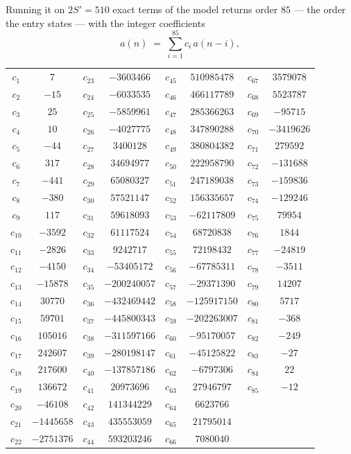 \documentclass[11pt,a4paper]{article}
\theoremstyle{plain}
\theoremstyle{definition}
\begin{document}
Running it on $2S'=510$ exact terms of the model returns order $85$ --- the order the
entry states --- with the integer coefficients
\[
a(n)\;=\;\sum_{i=1}^{85}c_i\,a(n-i),
\]
\begin{center}\small
\begin{tabular}{cccccccc}
$c_{1}$ & $7$ & $c_{23}$ & $-3603466$ & $c_{45}$ & $510985478$ & $c_{67}$ & $3579078$ \\
$c_{2}$ & $-15$ & $c_{24}$ & $-6033535$ & $c_{46}$ & $466117789$ & $c_{68}$ & $5523787$ \\
$c_{3}$ & $25$ & $c_{25}$ & $-5859961$ & $c_{47}$ & $285366263$ & $c_{69}$ & $-95715$ \\
$c_{4}$ & $10$ & $c_{26}$ & $-4027775$ & $c_{48}$ & $347890288$ & $c_{70}$ & $-3419626$ \\
$c_{5}$ & $-44$ & $c_{27}$ & $3400128$ & $c_{49}$ & $380804382$ & $c_{71}$ & $279592$ \\
$c_{6}$ & $317$ & $c_{28}$ & $34694977$ & $c_{50}$ & $222958790$ & $c_{72}$ & $-131688$ \\
$c_{7}$ & $-441$ & $c_{29}$ & $65080327$ & $c_{51}$ & $247189038$ & $c_{73}$ & $-159836$ \\
$c_{8}$ & $-380$ & $c_{30}$ & $57521147$ & $c_{52}$ & $156335657$ & $c_{74}$ & $-129246$ \\
$c_{9}$ & $117$ & $c_{31}$ & $59618093$ & $c_{53}$ & $-62117809$ & $c_{75}$ & $79954$ \\
$c_{10}$ & $-3592$ & $c_{32}$ & $61117524$ & $c_{54}$ & $68720838$ & $c_{76}$ & $1844$ \\
$c_{11}$ & $-2826$ & $c_{33}$ & $9242717$ & $c_{55}$ & $72198432$ & $c_{77}$ & $-24819$ \\
$c_{12}$ & $-4150$ & $c_{34}$ & $-53405172$ & $c_{56}$ & $-67785311$ & $c_{78}$ & $-3511$ \\
$c_{13}$ & $-15878$ & $c_{35}$ & $-200240057$ & $c_{57}$ & $-29371390$ & $c_{79}$ & $14207$ \\
$c_{14}$ & $30770$ & $c_{36}$ & $-432469442$ & $c_{58}$ & $-125917150$ & $c_{80}$ & $5717$ \\
$c_{15}$ & $59701$ & $c_{37}$ & $-445800343$ & $c_{59}$ & $-202263007$ & $c_{81}$ & $-368$ \\
$c_{16}$ & $105016$ & $c_{38}$ & $-311597166$ & $c_{60}$ & $-95170057$ & $c_{82}$ & $-249$ \\
$c_{17}$ & $242607$ & $c_{39}$ & $-280198147$ & $c_{61}$ & $-45125822$ & $c_{83}$ & $-27$ \\
$c_{18}$ & $217600$ & $c_{40}$ & $-137857186$ & $c_{62}$ & $-6797306$ & $c_{84}$ & $22$ \\
$c_{19}$ & $136672$ & $c_{41}$ & $20973696$ & $c_{63}$ & $27946797$ & $c_{85}$ & $-12$ \\
$c_{20}$ & $-46108$ & $c_{42}$ & $141344229$ & $c_{64}$ & $6623766$ &  &  \\
$c_{21}$ & $-1445658$ & $c_{43}$ & $435553059$ & $c_{65}$ & $21795014$ &  &  \\
$c_{22}$ & $-2751376$ & $c_{44}$ & $593203246$ & $c_{66}$ & $7080040$ &  &  \\
\end{tabular}
\end{center}
\end{document}
